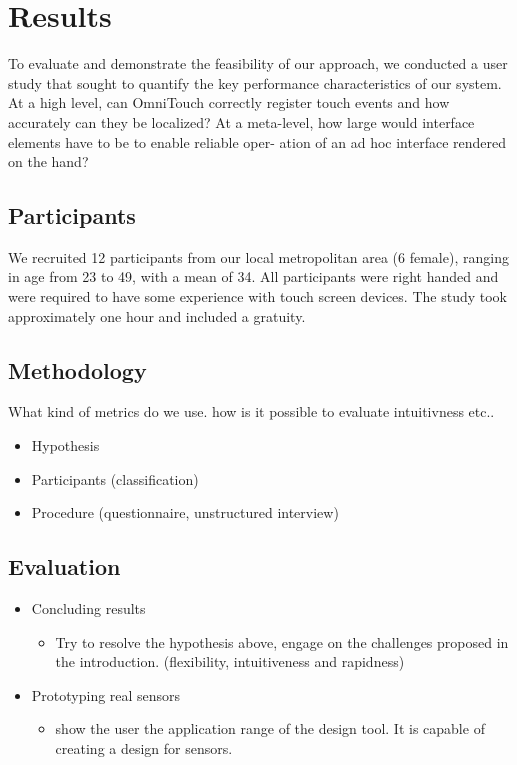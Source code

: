 

%
%

\sectionfix
\section{Results}
To evaluate and demonstrate the feasibility of our approach, we conducted a user study that sought to quantify the key performance characteristics of our system. At a high level, can OmniTouch correctly register touch events and how accurately can they be localized? At a meta-level, how large would interface elements have to be to enable reliable oper- ation of an ad hoc interface rendered on the hand?
\subsection{Participants} 
We recruited 12 participants from our local metropolitan area (6 female), ranging in age from 23 to 49, with a mean of 34. All participants were right handed and were required to have some experience with touch screen devices. The study took approximately one hour and included a gratuity.
\subsection{Methodology}
What kind of metrics do we use. how is it possible to evaluate intuitivness etc..
\begin{itemize}
\item Hypothesis 
\item Participants (classification)
\item Procedure (questionnaire, unstructured interview)
\end{itemize}
\subsection{Evaluation}
\begin{itemize}
\item Concluding results
\begin{itemize}
\item Try to resolve the hypothesis above, engage on the challenges proposed in the introduction. (flexibility, intuitiveness and rapidness)
\end{itemize}
\item Prototyping real sensors
\begin{itemize}
\item show the user the application range of the design tool. It is capable of creating a design for sensors.
\end{itemize}
\end{itemize}

